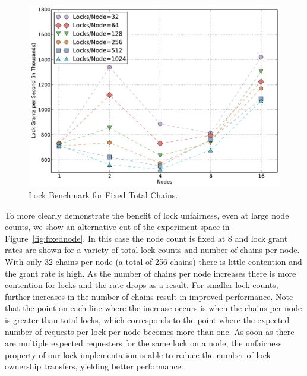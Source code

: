 
\begin{figure}
\begin{center}
\includegraphics[scale=0.33]{figs/fixed_lock_chains.pdf}
\end{center}
\vspace{-2mm}
\caption{Lock Benchmark for Fixed Total Chains.\label{fig:fixedlock}}
\vspace{-4mm}
\end{figure}

To more clearly demonstrate the benefit of lock unfairness, even at large node counts, we show an alternative
cut of the experiment space in Figure~\ref{fig:fixednode}.
In this case the node count is fixed at 8 and lock grant rates are shown for a variety of total lock counts
and number of chains per node.
With only 32 chains per node (a total of 256 chains)
there is little contention and the grant rate is high.  As the number of chains per node increases there is
more contention for locks and the rate drops as a result.  For smaller lock counts, further increases in
the number of chains result in improved performance.  Note that the point on each line where the increase occurs
is when the chains per node is greater than total locks, which corresponds to the point where the expected 
number of requests per lock 
per node becomes more than one.  As soon as there are multiple expected requesters for the same lock on
a node, the unfairness property of our lock implementation is able to reduce the number of lock ownership 
transfers, yielding better performance.

